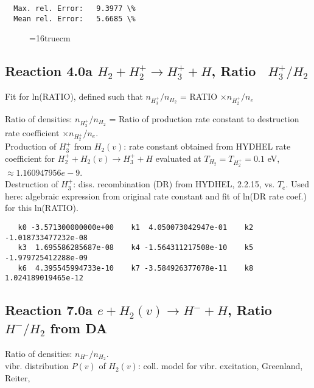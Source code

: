 \documentclass[12pt,dvipdfmx]{article}
\begin{document}
{\begin{small}
\begin{verbatim}
  Max. rel. Error:   9.3977 \%
  Mean rel. Error:   5.6685 \%
\end{verbatim}\end{small}


\begin{figure} \label{2.0a}
\epsfxsize=16truecm
\end{figure}

\newpage
\subsection{
Reaction 4.0a   $ H_2 + H_2^+ \rightarrow H_3^+ + H$, Ratio \ $H_3^+/H_2$
}

Fit for ln(RATIO), defined such that $n_{H_3^+}/n_{H_2}$ = RATIO $\times n_{H_2^+}/n_e$

 Ratio of densities: $n_{H_3^+}/n_{H_2}$ = Ratio of production rate constant
 to destruction rate coefficient $\times n_{H_2^+}/n_e$. \\
  Production of $H_3^+$ from $H_2(v)$:  rate constant obtained from HYDHEL rate coefficient
  for $ H_2^+ + H_2(v) \rightarrow H_3^+ + H$
  evaluated at $T_{H_2} = T_{H_2^+} = 0.1$ eV,  $ \approx 1.160947956 e-9$. \\
  Destruction of $H_3^+$: diss. recombination (DR) from HYDHEL, 2.2.15, vs. $T_e$.
  Used here: algebraic expression from original rate constant and fit of ln(DR rate coef.)
  for this ln(RATIO).

\begin{small}\begin{verbatim}
   k0 -3.571300000000e+00    k1  4.050073042947e-01    k2 -1.018733477232e-08
   k3  1.695586285687e-08    k4 -1.564311217508e-10    k5 -1.979725412288e-09
   k6  4.395545994733e-10    k7 -3.584926377078e-11    k8  1.024189019465e-12
\end{verbatim}\end{small}
\newpage

\subsection{
Reaction 7.0a    $ e + H_2(v) \rightarrow H^- + H$, Ratio \ $H^-/H_2$ from DA
}



 Ratio of densities: $n_{H^-}/n_{H_2}$. \\
  vibr. distribution $P(v)$ of $H_2(v)$: coll. model for vibr. excitation, Greenland, Reiter, \cite{kn:Green}\\

}
\end{document}

